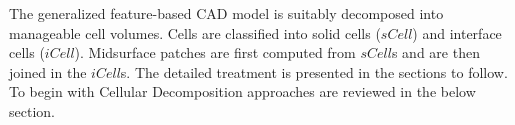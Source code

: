 
The generalized feature-based CAD model is suitably decomposed into manageable cell volumes. Cells are classified into solid cells ($sCell$) and interface cells ($iCell$). Midsurface patches are first computed from $sCell$s and are then joined in the $iCell$s.  The detailed treatment is presented in the sections to follow. To begin with Cellular Decomposition approaches are reviewed in the below section.

